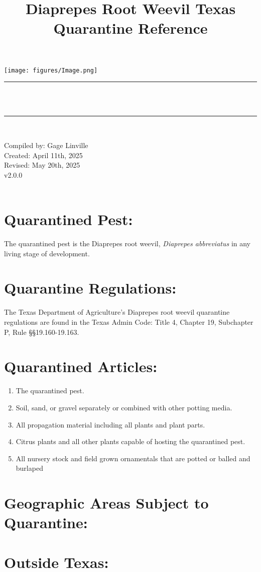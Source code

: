 \documentclass[12pt]{exam}
\title{Diaprepes Root Weevil Texas Quarantine Reference}			    %
\makeatletter
\newcommand{\semanticversion}{v2.0.0}               %
\newcommand{\studentone}{Gage Linville}			    %
\newcommand{\creationdate}{April 11th, 2025}         %
\newcommand{\revisiondate}{May 20th, 2025}           %
\def\maketitle{%
  \null
  \thispagestyle{empty}
  \begin{center}\leavevmode
       \normalfont
       \texttt{[image: figures/Image.png]}
	\rule{\linewidth}{0.2 mm} \\[0.4 cm]
	{ \huge \bfseries \@title}\\
	\rule{\linewidth}{0.2 mm} \\[0.4 cm]

	\begin{minipage}{0.5\textwidth}
		 \begin{center}\large
			Compiled by: \studentone\\
            Created: \creationdate\\
            Revised: \revisiondate\\
            \semanticversion\\
            \
			\end{center}
			\end{minipage}
   \end{center}
   \vfill
   \null
   \cleardoublepage
  }
\makeatother
\begin{document}
\maketitle
\let\cleardoublepage\clearpage
\sloppy

\section*{Quarantined Pest:}
The quarantined pest is the Diaprepes root weevil, \textit{Diaprepes abbreviatus} in any living stage of development. 

\section*{Quarantine Regulations:}
The Texas Department of Agriculture's Diaprepes root weevil quarantine regulations are found in the Texas Admin Code: Title 4, Chapter 19, Subchapter P, Rule §§19.160-19.163.

\section*{Quarantined Articles:}
\begin{enumerate}
\item The quarantined pest.
\item Soil, sand, or gravel separately or combined with other potting media.
\item All propagation material including all plants and plant parts.
\item Citrus plants and all other plants capable of hosting the quarantined pest.
\item All nursery stock and field grown ornamentals that are potted or balled and burlaped
\end{enumerate}

\section*{Geographic Areas Subject to Quarantine:}

\section{Outside Texas:}
\end{document}
